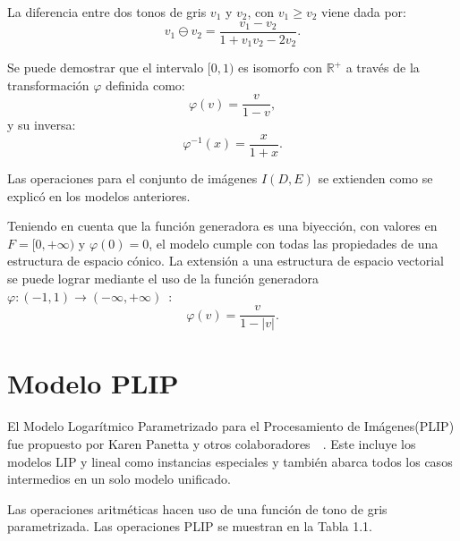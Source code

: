 La diferencia entre dos tonos de gris $v_1$ y $v_2$, con $v_1 \geq v_2$ viene dada por:
\begin{equation}
	v_1\ominus v_2=\frac{v_1-v_2}{1+v_1v_2-2v_2}.
\end{equation}

Se puede demostrar que el intervalo $[0, 1)$ es isomorfo con $\mathbb{R}^+$ a través de la transformaci\'on $\varphi$ definida como:
\begin{equation}
	\varphi(v)=\frac{v}{1-v},
\end{equation}
y su inversa:
\begin{equation}
	\varphi^{-1}(x)=\frac{x}{1+x}.
\end{equation}

Las operaciones para el conjunto de im\'agenes $I(D,E)$ se extienden como se explic\'o en los modelos anteriores.

Teniendo en cuenta que la función generadora es una biyección, con valores en $F = [ 0 , +\infty )$ y $\varphi(0)=0$, el modelo cumple con todas las propiedades de una estructura de espacio cónico. La extensión a una estructura de espacio vectorial se puede lograr mediante el uso de la función generadora $\varphi:(-1,1)\rightarrow (-\infty,+\infty)$~\cite{florea2009piecewise}:
\begin{equation}
	\varphi(v)=\frac{v}{1-|v|}.
\end{equation}

\section{Modelo PLIP}

El Modelo Logar\'itmico Parametrizado para el Procesamiento de Im\'agenes(PLIP) fue propuesto por Karen Panetta y otros colaboradores~\cite{panetta2007parameterization}~\cite{panetta2010parameterized}. Este incluye los modelos LIP y lineal como instancias especiales y también abarca todos los casos intermedios en un solo modelo unificado.

Las operaciones aritméticas hacen uso de una función de tono de gris parametrizada. Las operaciones PLIP se muestran en la Tabla 1.1.

